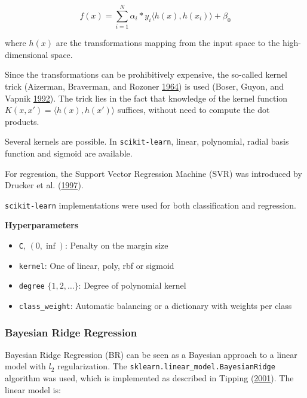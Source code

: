 \documentclass[
  11pt,
  a4paper,
  DIV=12,captions=tableheading,oneside,titlepage]{scrbook}
\providecommand{\tightlist}{%
  \setlength{\itemsep}{0pt}\setlength{\parskip}{0pt}}
\begin{document}
\begin{equation}
f(x) = \sum_{i=1}^N \alpha_i*y_i\langle h(x), h(x_i)\rangle + \beta_0
\label{eq:svm}
\end{equation}

where \(h(x)\) are the transformations mapping from the input space to the high-dimensional space.

Since the transformations can be prohibitively expensive, the so-called kernel trick (Aizerman, Braverman, and Rozoner \protect\hyperlink{ref-aizerman1964theoretical}{1964}) is used (Boser, Guyon, and Vapnik \protect\hyperlink{ref-boser1992svc}{1992}). The trick lies in the fact that knowledge of the kernel function \(K(x,x') = \langle h(x), h(x') \rangle\) suffices, without need to compute the dot products.

Several kernels are possible. In \texttt{scikit-learn}, linear, polynomial, radial basis function and sigmoid are available.

For regression, the Support Vector Regression Machine (SVR) was introduced by Drucker et al. (\protect\hyperlink{ref-drucker1997support}{1997}).

\texttt{scikit-learn} implementations were used for both classification and regression.

\textbf{Hyperparameters}

\begin{itemize}
\tightlist
\item
  \texttt{C}, \((0,\inf)\): Penalty on the margin size
\item
  \texttt{kernel}: One of linear, poly, rbf or sigmoid
\item
  \texttt{degree} \(\{1,2, \ldots \}\): Degree of polynomial kernel
\item
  \texttt{class\_weight}: Automatic balancing or a dictionary with weights per class
\end{itemize}

\hypertarget{bayesian-ridge-regression}{%
\subsubsection{Bayesian Ridge Regression}\label{bayesian-ridge-regression}}

Bayesian Ridge Regression (BR) can be seen as a Bayesian approach to a linear model with \(l_2\) regularization. The \texttt{sklearn.linear\_model.BayesianRidge} algorithm was used, which is implemented as described in Tipping (\protect\hyperlink{ref-tipping2001sparse}{2001}). The linear model is:
\end{document}
